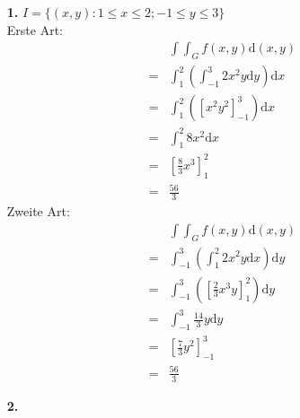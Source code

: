 \documentclass[a4paper,11pt]{article}
\title{\titleinfo}
\author{\authorinfotitle}
\date{\today}
\begin{document}
\maketitle
    \begin{enumerate}

            \item[\textbf{1.}]
                $I = \{ (x,y): 1 \leq x \leq 2; -1 \leq y \leq 3 \}$\\
                Erste Art:
                \begin{align}
                    & \int \int_G f(x,y) \mathrm{d}(x,y)\\
                    = & \int_1^2 \left( \int_{-1}^3 2x^2y \mathrm{d}y\right)\mathrm{d}x\\
                    = & \int_1^2 \left( [x^2y^2]_{-1}^3 \right)\mathrm{d}x\\
                    = & \int_1^2 8x^2\mathrm{d}x\\
                    = & [\frac{8}{3}x^3]_1^2\\
                    = & \frac{56}{3}
                \end{align}
                Zweite Art:
                \begin{align}
                    & \int \int_G f(x,y) \mathrm{d}(x,y)\\
                    = & \int_{-1}^3 \left( \int_1^2 2x^2y \mathrm{d}x \right) \mathrm{d}y\\
                    = & \int_{-1}^3 \left( [ \frac{2}{3}x^3 y ]_1^2 \right) \mathrm{d}y\\
                    = & \int_{-1}^3 \frac{14}{3}y \mathrm{d}y\\
                    = & [ \frac{7}{3}y^2 ]_{-1}^{3}\\
                    = & \frac{56}{3}
                \end{align}
            \item[\textbf{2.}]



\end{enumerate}
\end{document}
